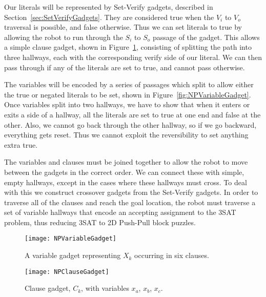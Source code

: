 Our literals will be represented by Set-Verify gadgets, described in Section~\ref{sec:SetVerifyGadgets}. They are considered true when the $V_i$ to $V_o$ traversal is possible, and false otherwise. Thus we can set literals to true by allowing the robot to run through the $S_i$ to $S_o$ passage of the gadget. This allows a simple clause gadget, shown in Figure~\ref{fig:NPClauseGadget}, consisting of splitting the path into three hallways, each with the corresponding verify side of our literal. We can then pass through if any of the literals are set to true, and cannot pass otherwise.

The variables will be encoded by a series of passages which split to allow either the true or negated literals to be set, shown in Figure~\ref{fig:NPVariableGadget}. Once variables split into two hallways, we have to show that when it enters or exits a side of a hallway, all the literals are set to true at one end and false at the other. Also, we cannot go back through the other hallway, so if we go backward, everything gets reset. Thus we cannot exploit the reversibility to set anything extra true.

The variables and clauses must be joined together to allow the robot to move between the gadgets in the correct order. We can connect these with simple, empty hallways, except in the cases where these hallways must cross. To deal with this we construct crossover gadgets from the Set-Verify gadgets. In order to traverse all of the clauses and reach the goal location, the robot must traverse a set of variable hallways that encode an accepting assignment to the 3SAT problem, thus reducing 3SAT to 2D Push-Pull block puzzles.


\begin{figure}[!ht]
\begin{minipage}{.57\textwidth}
  \centering
    \texttt{[image: NPVariableGadget]}
    \caption{A variable gadget representing $X_k$ occurring in six clauses.}
    \label{fig:NPVariableGadget}
\end{minipage}
\hspace{5mm}
\begin{minipage}{.36\textwidth}
    \texttt{[image: NPClauseGadget]}
    \caption{Clause gadget, $C_k$, with variables $x_a$, $x_b$, $x_c$.}
    \label{fig:NPClauseGadget}
\end{minipage}
\end{figure}

